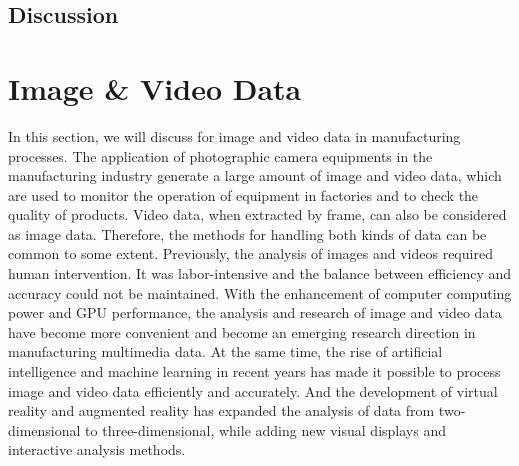 \documentclass[a4paper,fleqn]{cas-dc}
\begin{document}
\subsection{Discussion}

\section{Image \& Video Data}
In this section, we will discuss for image and video data in manufacturing processes.
The application of photographic camera equipments in the manufacturing industry generate a large amount of image and video data, which are used to monitor the operation of equipment in factories and to check the quality of products.
Video data, when extracted by frame, can also be considered as image data. Therefore, the methods for handling both kinds of data can be common to some extent.
Previously, the analysis of images and videos required human intervention. It was labor-intensive and the balance between efficiency and accuracy could not be maintained.
With the enhancement of computer computing power and GPU performance, the analysis and research of image and video data have become more convenient and become an emerging research direction in manufacturing multimedia data.
At the same time, the rise of artificial intelligence and machine learning in recent years has made it possible to process image and video data efficiently and accurately.
And the development of virtual reality and augmented reality has expanded the analysis of data from two-dimensional to three-dimensional, while adding new visual displays and interactive analysis methods.
\end{document}

